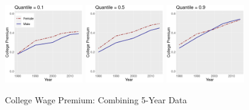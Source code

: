 \documentclass[beamer, t]{beamer}
\begin{document}
\begin{frame}
	
	\bigskip
	
	\begin{figure}[!h]
		\centering
		\caption{College Wage Premium: %
			Combining 5-Year Data %
		}
	\bigskip
			\includegraphics[width=0.3\textwidth]{figures/chart_1_03_FullT_5yr.png}  \includegraphics[width=0.3\textwidth]{figures/chart_5_03_FullT_5yr.png} \includegraphics[width=0.3\textwidth]{figures/chart_9_03_FullT_5yr.png} 
			
	\end{figure}
	
\end{frame}
\end{document}
